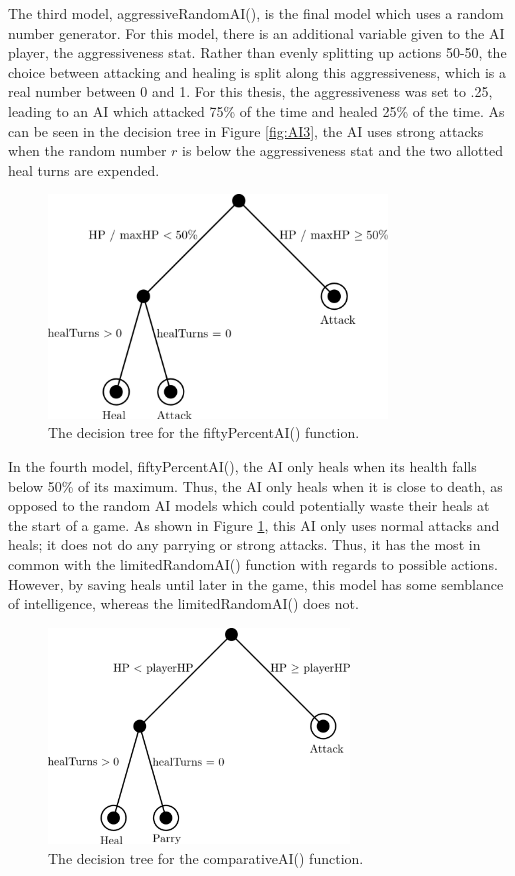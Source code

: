The third model, aggressiveRandomAI(), is the final model which uses a random number generator. For this model, there is an additional variable given to the AI player, the aggressiveness stat. Rather than evenly splitting up actions 50-50, the choice between attacking and healing is split along this aggressiveness, which is a real number between 0 and 1. For this thesis, the aggressiveness was set to .25, leading to an AI which attacked 75\% of the time and healed 25\% of the time. As can be seen in the decision tree in Figure \ref{fig:AI3}, the AI uses strong attacks when the random number $r$ is below the aggressiveness stat and the two allotted heal turns are expended.

\begin{figure}[H]
  \centering
  \includegraphics[width=9cm]{figures/AI50Percent.png}
  \caption{The decision tree for the fiftyPercentAI() function.}
  \label{fig:AI4}
\end{figure}

In the fourth model, fiftyPercentAI(), the AI only heals when its health falls below 50\% of its maximum. Thus, the AI only heals when it is close to death, as opposed to the random AI models which could potentially waste their heals at the start of a game. As shown in Figure \ref{fig:AI4}, this AI only uses normal attacks and heals; it does not do any parrying or strong attacks. Thus, it has the most in common with the limitedRandomAI() function with regards to possible actions. However, by saving heals until later in the game, this model has some semblance of intelligence, whereas the limitedRandomAI() does not.

\begin{figure}[H]
  \centering
  \includegraphics[width=8cm]{figures/AIComparative.png}
  \caption{The decision tree for the comparativeAI() function.}
  \label{fig:AI5}
\end{figure}

